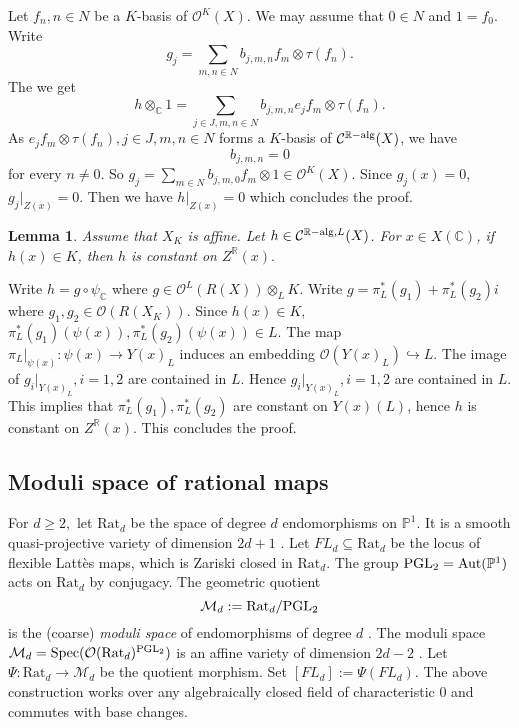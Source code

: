 \documentclass[12pt]{amsart}
\theoremstyle{plain}
\newtheorem{Lem}[Thm]{Lemma}
\theoremstyle{remark}
\theoremstyle{definition}
\def\R{\mathbb R}
\def\C{\mathbb C}
\def\sC{\mathcal C}
\def\P{\mathbb P}
\def\sM{\mathcal M}
\def\sO{\mathcal O}
\def\PGL{{\rm PGL}}
\def\Spec{{\rm Spec}}
\def\alg{{\rm alg}}
\def\Aut{{\rm Aut}}
\begin{document}
Let $f_n, n\in N$ be a $K$-basis of $\sO^K(X).$ We may assume that $0\in N$ and $1=f_0.$
Write $$g_j=\sum_{m,n\in N}b_{j,m,n}f_m\otimes \tau(f_n).$$
The we get
$$h\otimes_{\C} 1=\sum_{j\in J, m,n\in N}b_{j,m,n}e_jf_m\otimes \tau(f_n).$$
As $e_jf_m\otimes \tau(f_n), j\in J, m,n\in N$ forms a $K$-basis of $\sC^{\R-\alg}(X)$, we have 
$$b_{j,m,n}=0$$
for every $n\neq 0.$ So $g_j=\sum_{m\in N}b_{j,m,0}f_m\otimes 1\in \sO^K(X).$
Since $g_j(x)=0$, $g_j|_{Z(x)}=0.$
Then we have $h|_{Z(x)}=0$ which concludes the proof.
\endproof

\begin{Lem}\label{lemvaluek}Assume that $X_K$ is affine. Let $h\in \sC^{\R-\alg,L}(X)$. For $x\in X(\C)$, if $h(x)\in K$, then $h$ is constant on $Z^{\R}(x).$
\end{Lem}
\proof
Write $h=g\circ \psi_{\C}$ where $g\in \sO^L(R(X))\otimes_LK$. Write $g=\pi_L^*(g_1)+\pi_L^*(g_2)i$ where $g_1,g_2\in \sO(R(X_K)).$ Since $h(x)\in K$, $\pi_L^*(g_1)(\psi(x)), \pi_L^*(g_2)(\psi(x))\in L.$
The map $\pi_L|_{\psi(x)}: \psi(x)\to Y(x)_L$ induces an embedding $\sO(Y(x)_L)\hookrightarrow L.$ The image of $g_i|_{Y(x)_L}, i=1,2$ are contained in $L$.
Hence $g_i|_{Y(x)_L}, i=1,2$ are contained in $L.$ This implies that $\pi_L^*(g_1), \pi_L^*(g_2)$ are constant on $Y(x)(L)$, hence $h$ is constant on $Z^{\R}(x).$ This concludes the proof.
\endproof


\subsection{Moduli space of rational maps}
For $d\geq 2,$ let $\text{Rat}_d$ be the space of degree $d$ endomorphisms on $\P^1$.  
It is a smooth quasi-projective variety of dimension $2d+1$ \cite{Silverman2012}. 
Let $FL_d\subseteq \text{Rat}_d$ be the locus of flexible Latt\`es maps, which is Zariski closed in $\text{Rat}_d$.
The group $\PGL_2= \Aut(\P^1)$ acts on $\text{Rat}_d$ by conjugacy. The geometric quotient 
$$\sM_d:=\text{Rat}_d/\PGL_2$$ is the (coarse) \emph{moduli space} of endomorphisms  of degree $d$ \cite{Silverman2012}.
The moduli space $\sM_d=\Spec (\sO(\text{Rat}_d)^{\PGL_2})$ is an affine variety of dimension $2d-2$ \cite[Theorem 4.36(c)]{Silverman2007}.
Let $\Psi: \text{Rat}_d\to \sM_d$ be the quotient morphism.  Set $[FL_d]:=\Psi(FL_d).$ 
The above construction works over any algebraically closed field of characteristic $0$ and commutes with base changes.
\medskip
\end{document}
